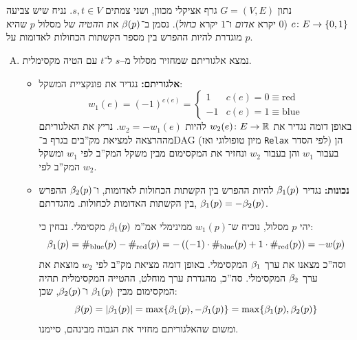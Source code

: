 \documentclass[]{../../../../tex/classes/homework}
\begin{document}
	 \section{}
	נתון $G = (V, E)$ גרף אציקלי מכוון, ושני צמתים $s, t \in V$. נניח שיש צביעה $c \colon E \to \{0, 1\}$ ($0$ יקרא \textit{אדום} ו־$1$ יקרא \textit{כחול}). נסמן ב־$\beta(p)$ את ה\textit{הטיה} של מסלול $p$ שהיא מוגדרת להיות ההפרש בין מספר הקשתות הכחולות לאדומות על $p$. 
	\begin{enumerate}[(A)]
		\item נמצא אלגוריתם שמחזיר מסלול מ–$s$ ל־$t$ עם הטיה מקסימלית. 
		\begin{itemize}
			\item \textbf{אלגוריתם: }נגדיר את פונקציית המשקל: 
			\[ w_1(e) = (-1)^{c(e)} = \begin{cases}
				1 & c(e) = 0 \equiv \mathrm{red} \\
				-1 & c(e) = 1 \equiv \mathrm{blue}
			\end{cases} \]
			באופן דומה נגדיר את $w_2(e)\colon E \to \mathbb{R}$ להיות $w_2 = -w_1(e)$. 
			נריץ את האלגוריתם מההרצאה למציאת מק''בים בגרף ב־DAG (מיון טופולוגי ואז \texttt{Relax} לפי הסדר) הן בעבור $w_1$ והן בעבור $w_2$ ונחזיר את המקסימום מבין משקל המק''ב לפי $w_1$ ומשקל המק''ב לפי $w_2$. 
			\item \textbf{נכונות: }נגדיר $\beta_1(p)$ להיות ההפרש בין הקשתות הכחולות לאדומות, ו־$\beta_2(p)$ ההפרש בין הקשתות האדומות לכחולות. מהגדרתם, $\beta_1(p) = -\beta_2(p)$. 
			
			יהי $p$ מסלול, נוכיח ש־$w_1(p)$ ממינימלי אמ''מ $\beta_1(p)$ מקסימלי. נבחין כי: 
			\[ \beta_1(p) = \#_{\mathrm{blue}}(p) - \#_{\mathrm{red}}(p) = -\left ( (-1)\cdot \#_{\mathrm{blue}}(p) + 1 \cdot \#_{\mathrm{red}}(p) \right ) = -w(p) \]
			וסה''כ מצאנו את ערך $\beta_1$ המקסימלי. 
			באופן דומה מציאת מק''ב לפי $w_2$ מוצאת את ערך $\beta_2$ המקסימלי. סה''כ, מהגדרת ערך מוחלט, ההטייה המקסימלית תהיה המקסימום מבין $\beta_1(p)$ ו־$\beta_2(p)$, שכן: 
			\[ \beta(p) = \left \lvert \beta_1(p) \right \rvert = \max\{\beta_1(p), - \beta_1(p)\} = \max\{\beta_1(p), \beta_2(p)\} \]
			ומשום שהאלגוריתם מחזיר את הגבוה מבינהם, סיימנו. 
			

\end{itemize}
\end{enumerate}
\end{document}
